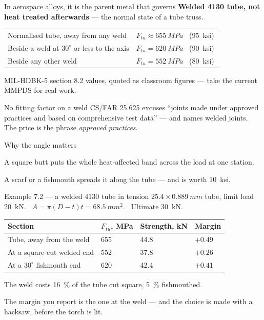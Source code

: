 \documentclass[aspectratio=169,10pt]{beamer}
\begin{document}
\begin{frame}{In aerospace alloys, it is the parent metal that governs}
\textbf{Welded 4130 tube, not heat treated afterwards} --- the normal state of a tube truss.

\medskip
\centering
\begin{tabular}{@{}ll@{}}
\toprule
Normalised tube, away from any weld & $F_{tu}\approx\SI{655}{MPa}$ \ (\SI{95}{ksi})\\
Beside a weld at $30^\circ$ or less to the axis & $F_{tu}=\SI{620}{MPa}$ \ (\SI{90}{ksi})\\
Beside any other weld & $F_{tu}=\SI{552}{MPa}$ \ (\SI{80}{ksi})\\
\bottomrule
\end{tabular}

\vfill\raggedright\footnotesize
MIL-HDBK-5 section 8.2 values, quoted as classroom figures --- take the current MMPDS for real work.

\normalsize\vfill
\begin{block}{No fitting factor on a weld}
CS/FAR 25.625 excuses ``joints made under approved practices and based on comprehensive test
data'' --- and names welded joints. The price is the phrase \emph{approved practices}.
\end{block}
\end{frame}

\begin{frame}{Why the angle matters}
\centering
\resizebox{0.95\textwidth}{!}{}

\vfill\raggedright
A square butt puts the whole heat-affected band across the load at one station.

A scarf or a fishmouth spreads it along the tube --- and is worth \SI{10}{ksi}.
\end{frame}

\begin{frame}{Example 7.2 --- a welded 4130 tube in tension}
$25.4\times\SI{0.889}{mm}$ tube, limit load \SI{20}{kN}. \ $A=\pi(D-t)t=\SI{68.5}{mm^2}$. \ Ultimate \SI{30}{kN}.

\vfill
\centering
\begin{tabular}{@{}llll@{}}
\toprule
Section & $F_{tu}$, MPa & Strength, kN & Margin\\
\midrule
Tube, away from the weld & 655 & 44.8 & $+0.49$\\
At a square-cut welded end & 552 & 37.8 & \alert{$+0.26$}\\
At a $30^\circ$ fishmouth end & 620 & 42.4 & $+0.41$\\
\bottomrule
\end{tabular}

\vfill\raggedright
The weld costs \SI{16}{\percent} of the tube cut square, \SI{5}{\percent} fishmouthed.

\medskip
The margin you report is the one \alert{at the weld} --- and the choice is made with a hacksaw,
before the torch is lit.
\end{frame}
\end{document}
